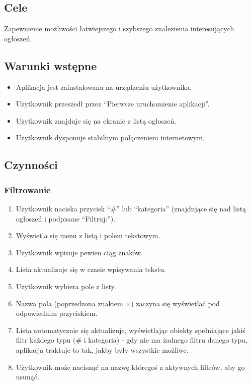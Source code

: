 \documentclass[12pt,a4paper,twoside]{article}
\begin{document}
    
    \subsection{Cele}
    Zapewnienie możliwości łatwiejszego i szybszego znalezienia interesujących ogłoszeń.
    
    
    \subsection{Warunki wstępne}
    \begin{itemize}
        \item Aplikacja jest zainstalowana na urządzeniu użytkownika.
        \item Użytkownik przeszedł przez ``Pierwsze uruchomienie aplikacji''.
        \item Użytkownik znajduje się na ekranie z listą ogłoszeń.
        \item Użytkownik dysponuje stabilnym połączeniem internetowym.
    \end{itemize}
    
    
    \subsection{Czynności}
    
    
    \subsubsection{Filtrowanie}
    
    
    \begin{enumerate}
        \item Użytkownik naciska przycisk ``\#'' lub ``kategoria'' (znajdujące się nad listą ogłoszeń i podpisane ``Filtruj:'').
        \item Wyświetla się menu z listą i polem tekstowym.
        \item Użytkownik wpisuje pewien ciąg znaków.
        \item Lista aktualizuje się w czasie wpisywania tekstu.
        \item Użytkownik wybiera pole z listy.
        \item Nazwa pola (poprzedzona znakiem $\times$) zaczyna się wyświetlać pod odpowiednim przyciskiem.
        \item Lista automatycznie się aktualizuje, wyświetlając obiekty spełniające jakiś filtr każdego typu (\# i kategoria) - gdy nie ma żadnego filtru danego typu, aplikacja traktuje to tak, jakby były wszystkie możliwe.
        \item Użytkownik może nacisnąć na nazwę któregoś z aktywnych filtrów, aby go usunąć.
    \end{enumerate}
    
\end{document}
